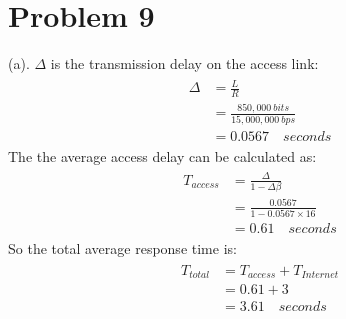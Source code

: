 \documentclass[titlepage, paper=a4, fontsize=11pt]{scrartcl} %
\numberwithin{equation}{section} %
\numberwithin{figure}{section} %
\numberwithin{table}{section} %
\begin{document}
\section*{Problem 9}
(a). $\Delta$ is the transmission delay on the access link:
\begin{align*} 
\begin{split}
\Delta &= \frac{L}{R} \\
&= \frac{850,000 \  bits}{15,000,000 \  bps} \\
&= 0.0567 \quad seconds
\end{split}					
\end{align*}
The the average access delay can be calculated as:
\begin{align*} 
\begin{split}
T_{access} &= \frac{\Delta}{1-\Delta\beta} \\
&= \frac{0.0567}{1-0.0567 \times 16} \\
&= 0.61 \quad seconds
\end{split}					
\end{align*}
So the total average response time is:
\begin{align*} 
\begin{split}
T_{total} &= T_{access} + T_{Internet} \\
&= 0.61 + 3 \\
&= 3.61 \quad seconds
\end{split}					
\end{align*}
\end{document}
